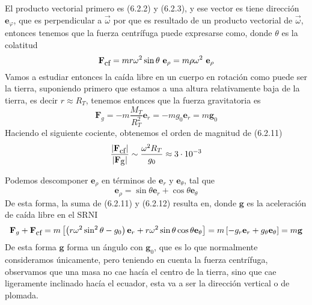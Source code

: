 El producto vectorial primero es (6.2.2) y (6.2.3), y ese vector es tiene dirección $\mathbf{e}_\varphi$, que es perpendicular a $\vec{\omega}$ por que es resultado de un producto vectorial de $\vec{\omega}$, entonces tenemos que la fuerza centrífuga puede expresarse como, donde $\theta$ es la colatitud
\begin{equation} \label{6.1.1}
    \mathbf{F}_{\mbox{\small cf}}= m r \omega^2 \sin \theta \  \mathbf{e}_\rho = m \rho \omega^2 \  \mathbf{e}_\rho
\end{equation} 
Vamos a estudiar entonces la caída libre en un cuerpo en rotación como puede ser la tierra, suponiendo primero que estamos a una altura relativamente baja de la tierra, es decir $r\approx R_T$, tenemos entonces que la fuerza gravitatoria es
\begin{equation} \label{6.1.1}
    \mathbf{F}_{g}= - m \frac{M_T}{R_T^2} \mathbf{e}_r = -m g_0 \mathbf{e}_r = m \mathbf{g}_0
\end{equation} 
Haciendo el siguiente cociente, obtenemos el orden de magnitud de (6.2.11)
\begin{equation} \label{6.1.1}
    \frac{|\mathbf{F}_{\mbox{\small cf}}|}{|\mathbf{F}_{\mbox{g}}|} \sim \frac{\omega^2 R_T}{g_0} \approx 3 \cdot 10^{-3}
\end{equation} 
\begin{marginfigure}[0pt]
    \def\svgwidth{5 cm}
    \normalsize
	
    \vspace{-10pt}
\end{marginfigure}
\vspace{-15pt}
Podemos descomponer $\mathbf{e}_\rho$ en términos de $\mathbf{e}_r$ y $\mathbf{e}_\theta$, tal que
\begin{equation} \label{6.1.1}
    \mathbf{e}_\rho = \sin\theta \mathbf{e}_r + \cos\theta \mathbf{e}_\theta
\end{equation} 
De esta forma, la suma de (6.2.11) y (6.2.12) resulta en, donde $\mathbf{g}$ es la aceleración de caída libre en el SRNI
\begin{equation} \label{6.1.1}
    \mathbf{F}_{g} +  \mathbf{F}_{\mbox{\small cf}} = m\left[\left(r\omega^2\sin^2\theta-g_0\right) \mathbf{e}_r + r\omega^2 \sin \theta \cos \theta \mathbf{e}_\theta \right] = m \left[-g_r \mathbf{e}_r + g_\theta \mathbf{e}_\theta\right] =  m\mathbf{g}
\end{equation} 
De esta forma $\mathbf{g}$ forma un ángulo con $\mathbf{g}_0$, que es lo que normalmente consideramos únicamente, pero teniendo en cuenta la fuerza centrífuga, observamos que una masa no cae hacía el centro de la tierra, sino que cae ligeramente inclinado hacía el ecuador, esta va a ser la dirección vertical o de plomada.

